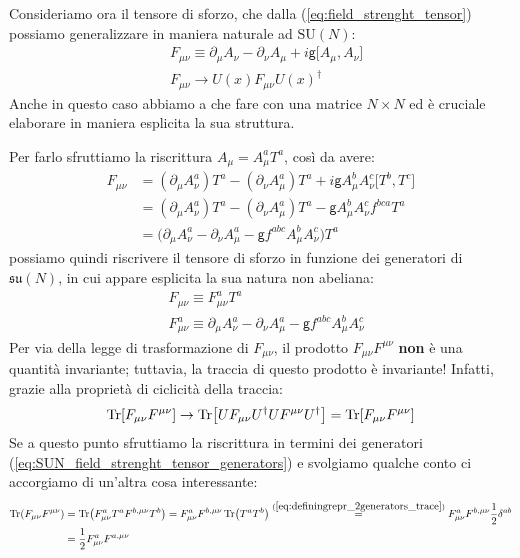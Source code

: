 \documentclass[../main.tex]{subfiles}
\begin{document}
Consideriamo ora il tensore di sforzo, che dalla (\ref{eq:field_strenght_tensor}) possiamo generalizzare in maniera naturale ad $\textrm{SU}(N)$:
\begin{equation}
    \begin{aligned}
        &F_{\mu\nu}\equiv  \partial_\mu A_\nu - \partial_\nu A_\mu + i\mathsf{g}\big[A_\mu, A_\nu\big]\\
        &F_{\mu\nu}\rightarrow U(x)F_{\mu\nu}U(x)^\dagger
    \end{aligned}
    \label{eq:SUN_field_strenght_tensor+transform}
\end{equation}
Anche in questo caso abbiamo a che fare con una matrice $N\times N$ ed è cruciale elaborare in maniera esplicita la sua struttura.

Per farlo sfruttiamo la riscrittura $A_\mu = A_\mu^aT^a$, così da avere:
\begin{align*}
    F_{\mu\nu}&= (\partial_\mu A_\nu^a)T^a - (\partial_\nu A_\mu^a)T^a + i\mathsf{g}A_\mu^b A_\nu^c\big[T^b, T^c\big]\\
    &=(\partial_\mu A_\nu^a)T^a - (\partial_\nu A_\mu^a)T^a - \mathsf{g}A_\mu^b A_\nu^c f^{bca}T^a\\
    &=\big(\partial_\mu A_\nu^a - \partial_\nu A_\mu^a - \mathsf{g}f^{abc}A_\mu^b A_\nu^c\big) T^a
\end{align*}
possiamo quindi riscrivere il tensore di sforzo in funzione dei generatori di $\mathfrak{su}(N)$, in cui appare esplicita la sua natura non abeliana:
\begin{equation}
    \boxed{\begin{aligned}
        &F_{\mu\nu} \equiv F_{\mu\nu}^aT^a\\
        &F_{\mu\nu}^a \equiv \partial_\mu A_\nu^a - \partial_\nu A_\mu^a - \mathsf{g}f^{abc}A_\mu^b A_\nu^c
    \end{aligned}}
    \label{eq:SUN_field_strenght_tensor_generators}
\end{equation}
Per via della legge di trasformazione di $F_{\mu\nu}$, il prodotto $F_{\mu\nu}F^{\mu\nu}$ \textbf{non} è una quantità invariante; tuttavia, la traccia di questo prodotto è invariante! Infatti, grazie alla proprietà di ciclicità della traccia:
\[
\Tr[F_{\mu\nu}F^{\mu\nu}] \rightarrow \Tr[UF_{\mu\nu}U^\dagger UF^{\mu\nu}U^\dagger] = \Tr[F_{\mu\nu}F^{\mu\nu}]
\]
Se a questo punto sfruttiamo la riscrittura in termini dei generatori (\ref{eq:SUN_field_strenght_tensor_generators}) e svolgiamo qualche conto ci accorgiamo di un'altra cosa interessante:
\begin{align*}
    \Tr(F_{\mu\nu}F^{\mu\nu}) &= \Tr(F_{\mu\nu}^aT^aF^{b,\mu\nu}T^b)=F_{\mu\nu}^aF^{b,\mu\nu}\Tr(T^aT^b)\overset{(\ref{eq:definingrepr_2generators_trace})}{=}F_{\mu\nu}^aF^{b,\mu\nu}\frac{1}{2}\delta^{ab}\\
    &=\frac{1}{2}F_{\mu\nu}^aF^{a,\mu\nu}
\end{align*}
\end{document}
